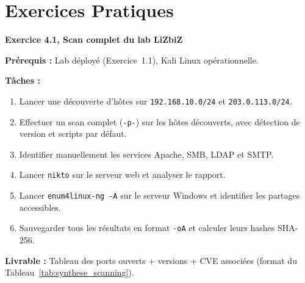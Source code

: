 \section*{Exercices Pratiques}

\begin{boxexo}
\textbf{Exercice 4.1, Scan complet du lab LiZbiZ}

\medskip
\textbf{Prérequis :} Lab déployé (Exercice~1.1), Kali Linux opérationnelle.

\medskip
\textbf{Tâches :}
\begin{enumerate}
    \item Lancer une découverte d'hôtes sur \texttt{192.168.10.0/24} et
          \texttt{203.0.113.0/24}.
    \item Effectuer un scan  complet (\texttt{-p-}) sur les
          hôtes découverts, avec détection de version et scripts par défaut.
    \item Identifier manuellement les services Apache, SMB, LDAP et SMTP.
    \item Lancer \texttt{nikto} sur le serveur web et analyser le rapport.
    \item Lancer \texttt{enum4linux-ng -A} sur le serveur Windows et
          identifier les partages accessibles.
    \item Sauvegarder tous les résultats en format \texttt{-oA} et calculer
          leurs hashes SHA-256.
\end{enumerate}

\medskip
\textbf{Livrable :} Tableau des ports ouverts + versions + CVE associées
(format du Tableau~\ref{tab:synthese_scanning}).
\end{boxexo}

